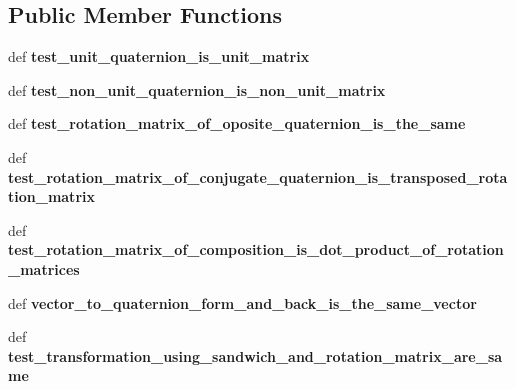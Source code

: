 \subsection*{Public Member Functions}
\begin{DoxyCompactItemize}
\item 
\hypertarget{classmsckf__test_1_1_test_quaternion_to_rotation_matrix_a5ce323c18ba9e5cf9c2793796ef313a8}{def {\bfseries test\-\_\-unit\-\_\-quaternion\-\_\-is\-\_\-unit\-\_\-matrix}}\label{classmsckf__test_1_1_test_quaternion_to_rotation_matrix_a5ce323c18ba9e5cf9c2793796ef313a8}

\item 
\hypertarget{classmsckf__test_1_1_test_quaternion_to_rotation_matrix_ac776e17660756aeb2029a96d19710c02}{def {\bfseries test\-\_\-non\-\_\-unit\-\_\-quaternion\-\_\-is\-\_\-non\-\_\-unit\-\_\-matrix}}\label{classmsckf__test_1_1_test_quaternion_to_rotation_matrix_ac776e17660756aeb2029a96d19710c02}

\item 
\hypertarget{classmsckf__test_1_1_test_quaternion_to_rotation_matrix_adb1f5ec79fbb9273b661cbdbbf642c72}{def {\bfseries test\-\_\-rotation\-\_\-matrix\-\_\-of\-\_\-oposite\-\_\-quaternion\-\_\-is\-\_\-the\-\_\-same}}\label{classmsckf__test_1_1_test_quaternion_to_rotation_matrix_adb1f5ec79fbb9273b661cbdbbf642c72}

\item 
\hypertarget{classmsckf__test_1_1_test_quaternion_to_rotation_matrix_aa2d7002bb2a55d8b16e148d16cbc7c0f}{def {\bfseries test\-\_\-rotation\-\_\-matrix\-\_\-of\-\_\-conjugate\-\_\-quaternion\-\_\-is\-\_\-transposed\-\_\-rotation\-\_\-matrix}}\label{classmsckf__test_1_1_test_quaternion_to_rotation_matrix_aa2d7002bb2a55d8b16e148d16cbc7c0f}

\item 
\hypertarget{classmsckf__test_1_1_test_quaternion_to_rotation_matrix_ac52b74a18ab3ac86e31c18cfc8e05a66}{def {\bfseries test\-\_\-rotation\-\_\-matrix\-\_\-of\-\_\-composition\-\_\-is\-\_\-dot\-\_\-product\-\_\-of\-\_\-rotation\-\_\-matrices}}\label{classmsckf__test_1_1_test_quaternion_to_rotation_matrix_ac52b74a18ab3ac86e31c18cfc8e05a66}

\item 
\hypertarget{classmsckf__test_1_1_test_quaternion_to_rotation_matrix_aa7654932fddf9ceff835f95fa592d01d}{def {\bfseries vector\-\_\-to\-\_\-quaternion\-\_\-form\-\_\-and\-\_\-back\-\_\-is\-\_\-the\-\_\-same\-\_\-vector}}\label{classmsckf__test_1_1_test_quaternion_to_rotation_matrix_aa7654932fddf9ceff835f95fa592d01d}

\item 
\hypertarget{classmsckf__test_1_1_test_quaternion_to_rotation_matrix_a059360bc65644e9013dd18e7eb1ac16e}{def {\bfseries test\-\_\-transformation\-\_\-using\-\_\-sandwich\-\_\-and\-\_\-rotation\-\_\-matrix\-\_\-are\-\_\-same}}\label{classmsckf__test_1_1_test_quaternion_to_rotation_matrix_a059360bc65644e9013dd18e7eb1ac16e}

\end{DoxyCompactItemize}


